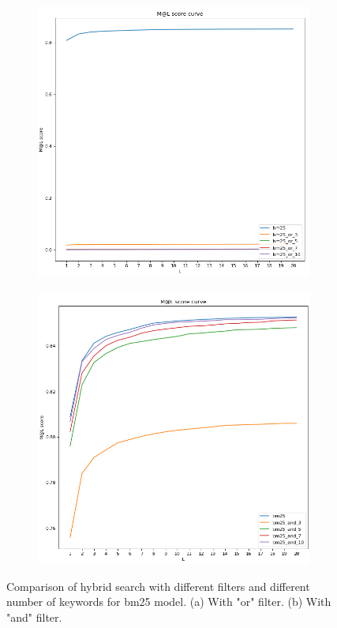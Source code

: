 \begin{figure}[htbp]
	\centering
	\begin{subfigure}[b]{0.48\textwidth}
		\centering
		\includegraphics[width=\textwidth]{figure/bm25_or.png}
		\caption{}
		\label{fig: hybrid_bm25_or}
	\end{subfigure}
	\hfill
	\begin{subfigure}[b]{0.48\textwidth}
		\centering
		\includegraphics[width=\textwidth]{figure/bm25_and.png}
		\caption{}
		\label{fig: hybrid_bm25_and}
	\end{subfigure}
	\hfill
	\caption[]{Comparison of hybrid search with different filters and different number of keywords for bm25 model. (a) With "or" filter. (b) With "and" filter.}
	\label{fig: hybrid_bm25_and_or}
\end{figure}

